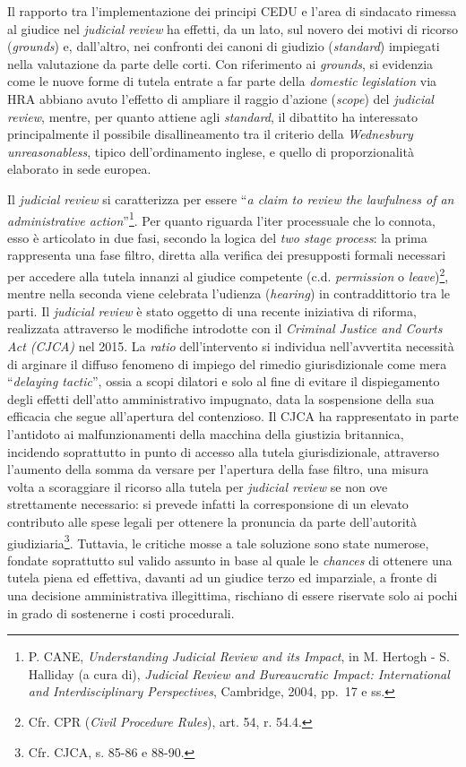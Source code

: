 \documentclass[12pt,it,a4paper,]{report}
\begin{document}
Il rapporto tra l'implementazione dei principi CEDU e l'area di
sindacato rimessa al giudice nel \emph{judicial review} ha effetti, da
un lato, sul novero dei motivi di ricorso (\emph{grounds}) e,
dall'altro, nei confronti dei canoni di giudizio (\emph{standard})
impiegati nella valutazione da parte delle corti. Con riferimento ai
\emph{grounds}, si evidenzia come le nuove forme di tutela entrate a far
parte della \emph{domestic legislation} via HRA abbiano avuto l'effetto
di ampliare il raggio d'azione (\emph{scope}) del \emph{judicial
review}, mentre, per quanto attiene agli \emph{standard}, il dibattito
ha interessato principalmente il possibile disallineamento tra il
criterio della \emph{Wednesbury unreasonabless}, tipico dell'ordinamento
inglese, e quello di proporzionalità elaborato in sede europea.

Il \emph{judicial review} si caratterizza per essere ``\emph{a claim to
review the lawfulness of an administrative action}''\footnote{P. CANE,
  \emph{Understanding Judicial Review and its Impact}, in M. Hertogh -
  S. Halliday (a cura di), \emph{Judicial Review and Bureaucratic
  Impact: International and Interdisciplinary Perspectives}, Cambridge,
  2004, pp.~17 e ss.}. Per quanto riguarda l'iter processuale che lo
connota, esso è articolato in due fasi, secondo la logica del \emph{two
stage process}: la prima rappresenta una fase filtro, diretta alla
verifica dei presupposti formali necessari per accedere alla tutela
innanzi al giudice competente (c.d. \emph{permission} o
\emph{leave})\footnote{Cfr. CPR (\emph{Civil Procedure Rules}), art. 54,
  r. 54.4.}, mentre nella seconda viene celebrata l'udienza
(\emph{hearing}) in contraddittorio tra le parti. Il \emph{judicial
review} è stato oggetto di una recente iniziativa di riforma, realizzata
attraverso le modifiche introdotte con il \emph{Criminal Justice and
Courts Act (CJCA)} nel 2015. La \emph{ratio} dell'intervento si
individua nell'avvertita necessità di arginare il diffuso fenomeno di
impiego del rimedio giurisdizionale come mera ``\emph{delaying
tactic}'', ossia a scopi dilatori e solo al fine di evitare il
dispiegamento degli effetti dell'atto amministrativo impugnato, data la
sospensione della sua efficacia che segue all'apertura del contenzioso.
Il CJCA ha rappresentato in parte l'antidoto ai malfunzionamenti della
macchina della giustizia britannica, incidendo soprattutto in punto di
accesso alla tutela giurisdizionale, attraverso l'aumento della somma da
versare per l'apertura della fase filtro, una misura volta a scoraggiare
il ricorso alla tutela per \emph{judicial review} se non ove
strettamente necessario: si prevede infatti la corresponsione di un
elevato contributo alle spese legali per ottenere la pronuncia da parte
dell'autorità giudiziaria\footnote{Cfr. CJCA, s. 85-86 e 88-90.}.
Tuttavia, le critiche mosse a tale soluzione sono state numerose,
fondate soprattutto sul valido assunto in base al quale le
\emph{chances} di ottenere una tutela piena ed effettiva, davanti ad un
giudice terzo ed imparziale, a fronte di una decisione amministrativa
illegittima, rischiano di essere riservate solo ai pochi in grado di
sostenerne i costi procedurali.
\end{document}
